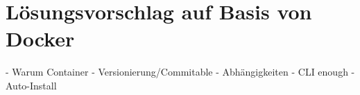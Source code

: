 \chapter{Lösungsvorschlag auf Basis von Docker}
\label{cha:possible-solution}

- Warum Container
- Versionierung/Commitable
- Abhängigkeiten
- CLI enough
- Auto-Install
